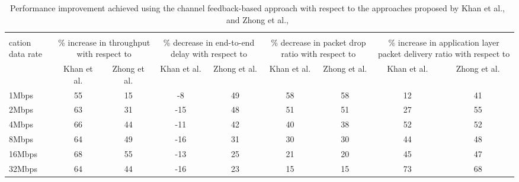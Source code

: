 \begin{table}[!htb]
	\centering
    \caption{Performance improvement achieved using the channel feedback-based approach with respect to the approaches proposed by Khan et al.,~\cite{khan2015towards} and Zhong et al.,~\cite{zhong2014capacity}}
  \label{tab:topology4ChannelImprovement}
  \renewcommand\multirowsetup{\centering}
    \begin{tabular}{|>{\centering} p{}|c|c|c|c|c|c|c|c|}
    \hline
    \multirow{2}{0.05\textwidth}{\newline \newline \newline Appli-\\cation data rate} & \multicolumn{2}{|p{0.08\textwidth}|}{\centering\% increase in throughput with respect to} & \multicolumn{2}{|p{0.08\textwidth}|}{\centering\% decrease in end-to-end delay with respect to} & \multicolumn{2}{|p{0.08\textwidth}|}{\centering\% decrease in packet drop ratio with respect to} & \multicolumn{2}{|p{0.08\textwidth}|}{\centering\% increase in application layer packet delivery ratio with respect to}\\
    \cline{2-9}
          & \multicolumn{1}{|p{0.025\textwidth}|}{\centering Khan et al.} & \multicolumn{1}{|p{0.025\textwidth}|}{\centering Zhong et al.} & \multicolumn{1}{|p{0.025\textwidth}|}{\centering Khan et al.} & \multicolumn{1}{|p{0.025\textwidth}|}{\centering Zhong et al.} & \multicolumn{1}{|p{0.03\textwidth}|}{\centering Khan et al.} & \multicolumn{1}{|p{0.025\textwidth}|}{\centering Zhong et al.} & \multicolumn{1}{|p{0.025\textwidth}|}{\centering Khan et al.} & \multicolumn{1}{|p{0.025\textwidth}|}{\centering Zhong et al.}\\
    \hline
    1Mbps & 55 & 15 & -8 & 49 & 58 & 58 & 12 & 41 \\\hline 
    2Mbps & 63 & 31 & -15 & 48 & 51 & 51 & 27 & 55 \\\hline 
    4Mbps & 66 & 44 & -11 & 42 & 40 & 38 & 52 & 52 \\\hline 
    8Mbps & 64 & 49 & -16 & 31 & 30 & 30 & 44 & 48\\\hline 
    16Mbps & 68 & 55 & -13 & 25 & 21 & 20 & 45 & 47 \\\hline 
    32Mbps & 64 & 44 & -16 & 23 & 15 & 15 & 73 & 68 \\\hline 
    \end{tabular}%
\end{table}

